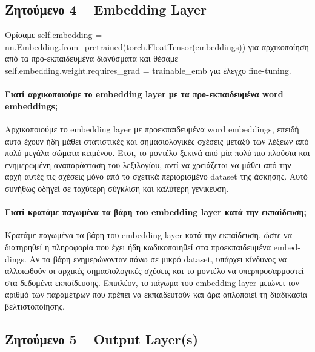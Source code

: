 \documentclass[11pt,a4paper]{article}
\begin{document}
\subsection*{Ζητούμενο 4 -- \textlatin{Embedding Layer}}


Ορίσαμε \textlatin{self.embedding = nn.Embedding.from\_pretrained(torch.FloatTensor(embeddings))} για αρχικοποίηση από τα προ-εκπαιδευμένα διανύσματα και θέσαμε \textlatin{self.embedding.weight.requires\_grad = trainable\_emb} για έλεγχο \textlatin{fine-tuning}.

\paragraph{Γιατί αρχικοποιούμε το \textlatin{embedding layer} με τα προ-εκπαιδευμένα \textlatin{word embeddings};}

Αρχικοποιούμε το \textlatin{embedding layer} με προεκπαιδευμένα \textlatin{word embeddings}, επειδή αυτά έχουν ήδη μάθει στατιστικές και σημασιολογικές σχέσεις μεταξύ των λέξεων από πολύ μεγάλα σώματα κειμένου. Έτσι, το μοντέλο ξεκινά από μία πολύ πιο πλούσια και ενημερωμένη αναπαράσταση του λεξιλογίου, αντί να χρειάζεται να μάθει από την αρχή αυτές τις σχέσεις μόνο από το σχετικά περιορισμένο \textlatin{dataset} της άσκησης. Αυτό συνήθως οδηγεί σε ταχύτερη σύγκλιση και καλύτερη γενίκευση.

\paragraph{Γιατί κρατάμε παγωμένα τα βάρη του \textlatin{embedding layer} κατά την εκπαίδευση;}

Κρατάμε παγωμένα τα βάρη του \textlatin{embedding layer} κατά την εκπαίδευση, ώστε να διατηρηθεί η πληροφορία που έχει ήδη κωδικοποιηθεί στα προεκπαιδευμένα \textlatin{embeddings}. Αν τα βάρη ενημερώνονταν πάνω σε μικρό \textlatin{dataset}, υπάρχει κίνδυνος να αλλοιωθούν οι αρχικές σημασιολογικές σχέσεις και το μοντέλο να υπερπροσαρμοστεί στα δεδομένα εκπαίδευσης. Επιπλέον, το πάγωμα του \textlatin{embedding layer} μειώνει τον αριθμό των παραμέτρων που πρέπει να εκπαιδευτούν και άρα απλοποιεί τη διαδικασία βελτιστοποίησης.

\subsection*{Ζητούμενο 5 -- \textlatin{Output Layer(s)}}
\end{document}
